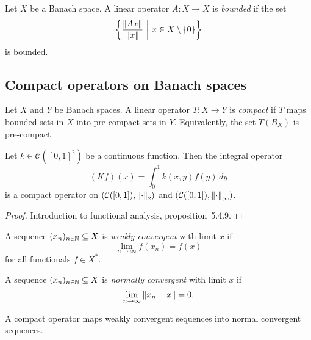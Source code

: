 \begin{definicija}
Let $X$ be a Banach space. A linear operator $A \colon X \to X$ is
\emph{bounded} if the set
\[
\left\{\frac{\left\lVert Ax\right\rVert}{\left\lVert x\right\rVert}~\middle\vert~x \in X \setminus \left\{0\right\}\right\}
\]
is bounded.
\end{definicija}

\newpage

\subsection{Compact operators on Banach spaces}

\begin{definicija}
Let $X$ and $Y$ be Banach spaces. A linear operator
$T \colon X \to Y$ is \emph{compact} if $T$
maps bounded sets in $X$ into pre-compact sets in $Y$.
Equivalently, the set $T(B_X)$ is pre-compact.
\end{definicija}

\begin{trditev}
Let $k \in \mathcal{C}([0,1]^2)$ be a continuous function. Then the
integral operator
\[
(Kf)(x) = \int_0^1 k(x,y) f(y)\,dy
\]
is a compact operator on $(\mathcal{C}([0,1]), \left\lVert \cdot\right\rVert_2)$ and
$(\mathcal{C}([0,1]), \left\lVert \cdot\right\rVert_\infty)$.
\end{trditev}

\begin{proof}
Introduction to functional analysis, proposition~5.4.9.
\end{proof}

\begin{definicija}
A sequence $(x_n)_{n \in \mathbb{N}} \subseteq X$ is
\emph{weakly convergent} with limit $x$ if
\[
\lim_{n \to \infty} f(x_n) = f(x)
\]
for all functionals $f \in X^*$.
\end{definicija}

\begin{definicija}
A sequence $(x_n)_{n \in \mathbb{N}} \subseteq X$ is
\emph{normally convergent} with limit $x$
if
\[
\lim_{n \to \infty} \left\lVert x_n - x\right\rVert = 0.
\]
\end{definicija}

\begin{izrek}
A compact operator maps weakly convergent sequences into normal
convergent sequences.
\end{izrek}

